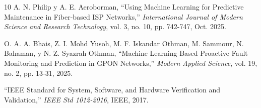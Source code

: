 \documentclass[12pt,a4paper]{article}
\begin{document}
\begin{thebibliography}{10}
A. N. Philip y A. E. Aeroborman, ``Using Machine Learning for Predictive Maintenance in Fiber-based ISP Networks,'' \textit{International Journal of Modern Science and Research Technology}, vol. 3, no. 10, pp. 742-747, Oct. 2025.

O. A. A. Bhais, Z. I. Mohd Yusoh, M. F. Iskandar Othman, M. Sammour, N. Bahaman, y N. Z. Syazrah Othman, ``Machine Learning-Based Proactive Fault Monitoring and Prediction in GPON Networks,'' \textit{Modern Applied Science}, vol. 19, no. 2, pp. 13-31, 2025.

``IEEE Standard for System, Software, and Hardware Verification and Validation,'' \textit{IEEE Std 1012-2016}, IEEE, 2017.

\end{thebibliography}
\end{document}
